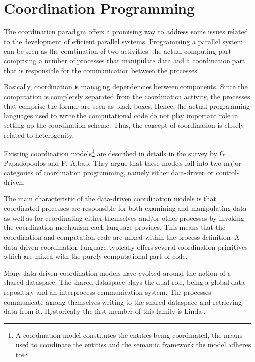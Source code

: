 
    \section{Coordination Programming}
The coordination paradigm offers a promising way to address some issues related to the development of efficient parallel systems. Programming a parallel system can be seen as the combination of two activities: the actual computing part comprising a number of processes that manipulate data and a coordination part that is responsible for the communication between the processes.

Basically, coordination is managing dependencies between components. Since the computation is completely separated from the coordination activity, the processes that comprise the former are seen as black boxes. Hence, the actual programming languages used to write the computational code do not play important role in setting up the coordination scheme. Thus, the concept of coordination is closely related to heterogenity.

Existing coordination models\footnote{A coordination model constitutes the entities being coordinated, the means used to ccordinate the entities and the semantic framework the model adheres to} are described in details in the survey \cite{papadopoulos} by G. Papadopoulos and F. Arbab. They argue that these models fall into two major categories of coordination programming, namely either data-driven or control-driven.

The main characteristic of the data-driven coordination models is that coordinated processes are responsible for both examining and manipulating data as well as for coordinating either themselves and/or other processes by invoking the coordination mechanism each language provides. This means that the coordination and computation code are mixed within the process definition. A data-driven coordination language typically offers several coordination primitives which are mixed with the purely computational part of code.

Many data-driven coordination models have evolved around the notion of a shared dataspace. The shared dataspace plays the dual role, being a global data repository and an interprocess communication system. The processes communicate among themselves writing to the shared dataspace and retrieving data from it. Hystorically the first member of this family is Linda \cite{linda}.

